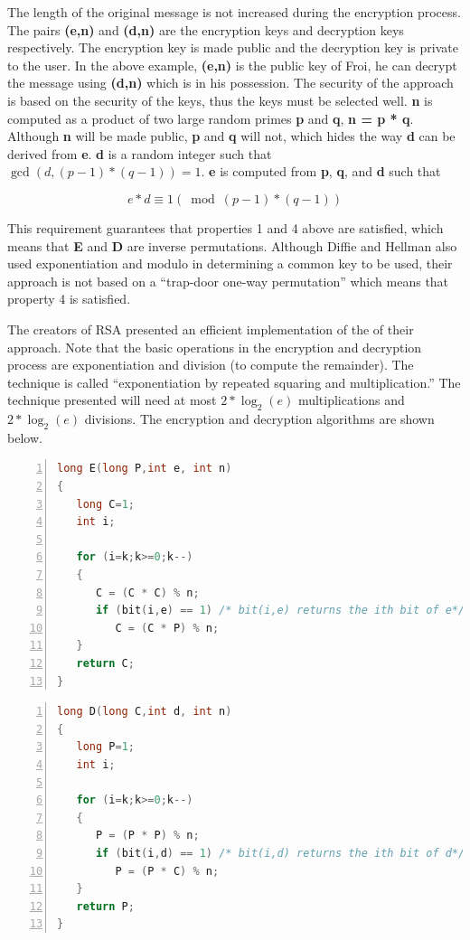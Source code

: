 \documentclass{article}
\begin{document}
The length of the original message is not increased during the encryption
process. The pairs \textbf{(e,n)} and \textbf{(d,n)} are the encryption
keys and decryption keys respectively. The encryption key is made
public and the decryption key is private to the user. In the above
example, \textbf{(e,n)} is the public key of Froi, he can decrypt
the message using \textbf{(d,n)} which is in his possession. The security
of the approach is based on the security of the keys, thus the keys
must be selected well. \textbf{n} is computed as a product of two
large random primes \textbf{p} and \textbf{q}, \textbf{n = p {*} q}.
Although \textbf{n} will be made public, \textbf{p} and \textbf{q}
will not, which hides the way \textbf{d} can be derived from \textbf{e}.
\textbf{d} is a random integer such that $\gcd(d,(p-1)*(q-1))=1$.
\textbf{e} is computed from \textbf{p}, \textbf{q}, and \textbf{d}
such that

\[
e*d\equiv1(\bmod(p-1)*(q-1))
\]


This requirement guarantees that properties 1 and 4 above are satisfied,
which means that \textbf{E} and \textbf{D} are inverse permutations.
Although Diffie and Hellman\cite{diffie_new_1976} also used exponentiation
and modulo in determining a common key to be used, their approach
is not based on a ``trap-door one-way permutation'' which means
that property 4 is satisfied.

The creators of RSA presented an efficient implementation of the of
their approach. Note that the basic operations in the encryption and
decryption process are exponentiation and division (to compute the
remainder). The technique is called ``exponentiation by repeated
squaring and multiplication.'' The technique presented will need
at most $2*\log_{2}(e)$ multiplications and $2*\log_{2}(e)$ divisions.
The encryption and decryption algorithms are shown below.
\begin{lstlisting}[language=C,numbers=left]
long E(long P,int e, int n)
{
   long C=1;
   int i;
   
   for (i=k;k>=0;k--)
   {
      C = (C * C) % n;
      if (bit(i,e) == 1) /* bit(i,e) returns the ith bit of e*/
         C = (C * P) % n;
   }
   return C;  
}
\end{lstlisting}

\begin{lstlisting}[language=C,numbers=left]
long D(long C,int d, int n)
{
   long P=1;
   int i;
   
   for (i=k;k>=0;k--)
   {
      P = (P * P) % n;
      if (bit(i,d) == 1) /* bit(i,d) returns the ith bit of d*/
         P = (P * C) % n;
   }
   return P;  
}
\end{lstlisting}
\end{document}
